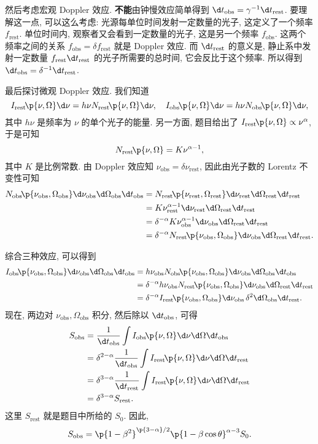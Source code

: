 \documentclass{article}
\newcommand{\mrm}[1]{\mathrm{#1}}
\newcommand{\tbf}[1]{\textbf{#1}}
\newcommand{\alp}{\alpha}
\newcommand{\gma}{\gamma}
\newcommand{\dlt}{\delta}
\newcommand{\tht}{\theta}
\newcommand{\Omg}{\Omega}
\newcommand{\fr}{\frac}
\newcommand{\fc}[2]{#1\mathchoice{\!}{\!}{}{}\p{#2}} %
\begin{document}
然后考虑宏观 Doppler 效应. \tbf{不能}由钟慢效应简单得到 $\d t_\mrm{obs}=\gma^{-1}\d t_\mrm{rest}$.
要理解这一点, 可以这么考虑: 光源每单位时间发射一定数量的光子, 这定义了一个频率 $f_\mrm{rest}$.
单位时间内, 观察者又会看到一定数量的光子, 这是另一个频率 $f_\mrm{obs}$.
这两个频率之间的关系 $f_\mrm{obs}=\dlt f_\mrm{rest}$ 就是 Doppler 效应.
而 $\d t_\mrm{rest}$ 的意义是, 静止系中发射一定数量
$f_\mrm{rest}\d t_\mrm{rest}$ 的光子所需要的总时间, 它会反比于这个频率.
所以得到 $\d t_\mrm{obs}=\dlt^{-1}\d t_\mrm{rest}$.

最后探讨微观 Doppler 效应.
我们知道
\[\fc{I_\mrm{rest}}{\nu,\Omg}\d\nu=h\nu\fc{N_\mrm{rest}}{\nu,\Omg}\d\nu,\quad
\fc{I_\mrm{obs}}{\nu,\Omg}\d\nu=h\nu\fc{N_\mrm{obs}}{\nu,\Omg}\d\nu,\]
其中 $h\nu$ 是频率为 $\nu$ 的单个光子的能量.
另一方面, 题目给出了 $\fc{I_\mrm{rest}}{\nu,\Omg}\propto\nu^\alp$, 于是可知
\[\fc{N_\mrm{rest}}{\nu,\Omg}=K\nu^{\alp-1},\]
其中 $K$ 是比例常数.
由 Doppler 效应知 $\nu_\mrm{obs}=\dlt\nu_\mrm{rest}$, 因此由光子数的 Lorentz 不变性可知
\begin{align*}
	\fc{N_\mrm{obs}}{\nu_\mrm{obs},\Omg_\mrm{obs}}\d\nu_\mrm{obs}\d\Omg_\mrm{obs}\d t_\mrm{obs}
	&=\fc{N_\mrm{rest}}{\nu_\mrm{rest},\Omg_\mrm{rest}}\d\nu_\mrm{rest}\d\Omg_\mrm{rest}\d t_\mrm{rest}\\
	&=K\nu_\mrm{rest}^{\alp-1}\d\nu_\mrm{rest}\d\Omg_\mrm{rest}\d t_\mrm{rest}\\
	&=\dlt^{-\alp}K\nu_\mrm{obs}^{\alp-1}\d\nu_\mrm{obs}\d\Omg_\mrm{rest}\d t_\mrm{rest}\\
	&=\dlt^{-\alp}\fc{N_\mrm{rest}}{\nu_\mrm{obs},\Omg_\mrm{obs}}\d\nu_\mrm{obs}\d\Omg_\mrm{rest}\d t_\mrm{rest}.
\end{align*}

综合三种效应, 可以得到
\begin{align*}
	\fc{I_\mrm{obs}}{\nu_\mrm{obs},\Omg_\mrm{obs}}\d\nu_\mrm{obs}\d\Omg_\mrm{obs}\d t_\mrm{obs}
	&=h\nu_\mrm{obs}\fc{N_\mrm{obs}}{\nu_\mrm{obs},\Omg_\mrm{obs}}\d\nu_\mrm{obs}\d\Omg_\mrm{obs}\d t_\mrm{obs}\\
	&=\dlt^{-\alp}h\nu_\mrm{obs}\fc{N_\mrm{rest}}{\nu_\mrm{obs},\Omg_\mrm{obs}}\d\nu_\mrm{obs}\d\Omg_\mrm{rest}\d t_\mrm{rest}\\
	&=\dlt^{-\alp}\fc{I_\mrm{rest}}{\nu_\mrm{obs},\Omg_\mrm{obs}}\d\nu_\mrm{obs}\,\dlt^2\d\Omg_\mrm{obs}\d t_\mrm{rest}.
\end{align*}
现在, 两边对 $\nu_\mrm{obs},\Omg_\mrm{obs}$ 积分, 然后除以 $\d t_\mrm{obs}$, 可得
\begin{align*}
	S_\mrm{obs}&=\fr1{\d t_\mrm{obs}}\int\fc{I_\mrm{obs}}{\nu,\Omg}\d\nu\d\Omg\d t_\mrm{obs}\\
	&=\dlt^{2-\alp}\fr1{\d t_\mrm{obs}}\int\fc{I_\mrm{rest}}{\nu,\Omg}\d\nu\d\Omg\d t_\mrm{rest}\\
	&=\dlt^{3-\alp}\fr1{\d t_\mrm{rest}}\int\fc{I_\mrm{rest}}{\nu,\Omg}\d\nu\d\Omg\d t_\mrm{rest}\\
	&=\dlt^{3-\alp}S_\mrm{rest}.
\end{align*}
这里 $S_\mrm{rest}$ 就是题目中所给的 $S_0$. 因此,
\[S_\mrm{obs}=\p{1-\beta^2}^{\p{3-\alp}/2}\p{1-\beta\cos\tht}^{\alp-3}S_0.\]
\end{document}
